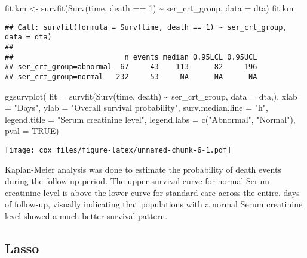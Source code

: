 \documentclass[
]{article}
\newenvironment{Shaded}{\begin{snugshade}}{\end{snugshade}}
\newcommand{\AttributeTok}[1]{\textcolor[rgb]{0.77,0.63,0.00}{#1}}
\newcommand{\ConstantTok}[1]{\textcolor[rgb]{0.00,0.00,0.00}{#1}}
\newcommand{\DecValTok}[1]{\textcolor[rgb]{0.00,0.00,0.81}{#1}}
\newcommand{\FunctionTok}[1]{\textcolor[rgb]{0.00,0.00,0.00}{#1}}
\newcommand{\NormalTok}[1]{#1}
\newcommand{\OtherTok}[1]{\textcolor[rgb]{0.56,0.35,0.01}{#1}}
\newcommand{\SpecialCharTok}[1]{\textcolor[rgb]{0.00,0.00,0.00}{#1}}
\newcommand{\StringTok}[1]{\textcolor[rgb]{0.31,0.60,0.02}{#1}}
\begin{document}
\begin{Shaded}
\begin{Highlighting}[]
\NormalTok{fit.km }\OtherTok{\textless{}{-}} \FunctionTok{survfit}\NormalTok{(}\FunctionTok{Surv}\NormalTok{(time, death }\SpecialCharTok{==} \DecValTok{1}\NormalTok{) }\SpecialCharTok{\textasciitilde{}}\NormalTok{ ser\_crt\_group, }\AttributeTok{data =}\NormalTok{ dta)}
\NormalTok{fit.km}
\end{Highlighting}
\end{Shaded}

\begin{verbatim}
## Call: survfit(formula = Surv(time, death == 1) ~ ser_crt_group, data = dta)
## 
##                          n events median 0.95LCL 0.95UCL
## ser_crt_group=abnormal  67     43    113      82     196
## ser_crt_group=normal   232     53     NA      NA      NA
\end{verbatim}

\begin{Shaded}
\begin{Highlighting}[]
\FunctionTok{ggsurvplot}\NormalTok{(}
    \AttributeTok{fit =} \FunctionTok{survfit}\NormalTok{(}\FunctionTok{Surv}\NormalTok{(time, death) }\SpecialCharTok{\textasciitilde{}}\NormalTok{ ser\_crt\_group, }\AttributeTok{data =}\NormalTok{ dta,),}
    \AttributeTok{xlab =} \StringTok{"Days"}\NormalTok{, }
    \AttributeTok{ylab =} \StringTok{"Overall survival probability"}\NormalTok{,}
    \AttributeTok{surv.median.line =} \StringTok{"h"}\NormalTok{,}
    \AttributeTok{legend.title =} \StringTok{"Serum creatinine level"}\NormalTok{,}
    \AttributeTok{legend.labs =} \FunctionTok{c}\NormalTok{(}\StringTok{"Abnormal"}\NormalTok{, }\StringTok{"Normal"}\NormalTok{),}
    \AttributeTok{pval =} \ConstantTok{TRUE}\NormalTok{)}
\end{Highlighting}
\end{Shaded}

\texttt{[image: cox\_files/figure-latex/unnamed-chunk-6-1.pdf]}

Kaplan-Meier analysis was done to estimate the probability of death
events during the follow-up period. The upper survival curve for normal
Serum creatinine level is above the lower curve for standard care across
the entire. days of follow-up, visually indicating that populations with
a normal Serum creatinine level showed a much better survival pattern.

\hypertarget{lasso}{%
\subsection{Lasso}\label{lasso}}
\end{document}
